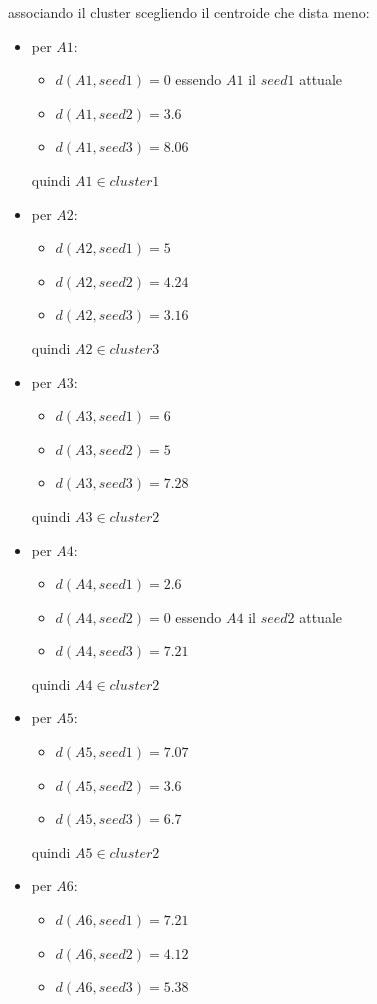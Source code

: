 \begin{esercizio}
  associando il cluster scegliendo il centroide che dista meno:
  \begin{itemize}
    \item per $A1$:
    \begin{itemize}
      \item $d(A1, seed1)=0$ essendo $A1$ il $seed1$ attuale
      \item $d(A1, seed2)=3.6$
      \item $d(A1, seed3)=8.06$
    \end{itemize}
    quindi $A1\in cluster1$
    \item per $A2$:
    \begin{itemize}
      \item $d(A2, seed1)=5$ 
      \item $d(A2, seed2)=4.24$
      \item $d(A2, seed3)=3.16$
    \end{itemize}
    quindi $A2\in cluster3$
    \item per $A3$:
    \begin{itemize}
      \item $d(A3, seed1)=6$ 
      \item $d(A3, seed2)=5$
      \item $d(A3, seed3)=7.28$
    \end{itemize}
    quindi $A3\in cluster2$
    \item per $A4$:
    \begin{itemize}
      \item $d(A4, seed1)=2.6$ 
      \item $d(A4, seed2)=0$ essendo $A4$ il $seed2$ attuale
      \item $d(A4, seed3)=7.21$
    \end{itemize}
    quindi $A4\in cluster2$
    \item per $A5$:
    \begin{itemize}
      \item $d(A5, seed1)=7.07$ 
      \item $d(A5, seed2)=3.6$
      \item $d(A5, seed3)=6.7$
    \end{itemize}
    quindi $A5\in cluster2$
    \item per $A6$:
    \begin{itemize}
      \item $d(A6, seed1)=7.21$ 
      \item $d(A6, seed2)=4.12$
      \item $d(A6, seed3)=5.38$

\end{itemize}
\end{itemize}
\end{esercizio}
